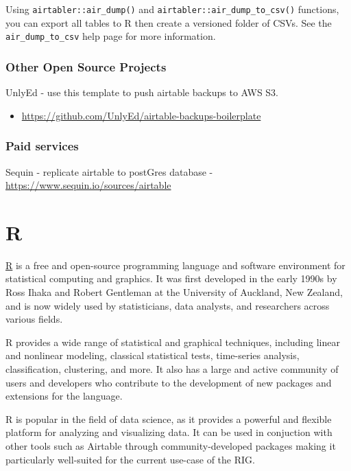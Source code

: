 \documentclass[
]{book}
\providecommand{\tightlist}{%
  \setlength{\itemsep}{0pt}\setlength{\parskip}{0pt}}
\begin{document}
Using \texttt{airtabler::air\_dump()} and \texttt{airtabler::air\_dump\_to\_csv()} functions, you can export all tables to R then create a versioned folder of CSVs. See the \texttt{air\_dump\_to\_csv} help page for more information.

\hypertarget{other-open-source-projects}{%
\subsubsection{Other Open Source Projects}\label{other-open-source-projects}}

UnlyEd - use this template to push airtable backups to AWS S3.

\begin{itemize}
\tightlist
\item
  \url{https://github.com/UnlyEd/airtable-backups-boilerplate}
\end{itemize}

\hypertarget{paid-services}{%
\subsubsection{Paid services}\label{paid-services}}

Sequin - replicate airtable to postGres database
- \url{https://www.sequin.io/sources/airtable}

\hypertarget{r}{%
\section{R}\label{r}}

\href{https://cran.r-project.org}{R} is a free and open-source programming language and software environment for statistical computing and graphics. It was first developed in the early 1990s by Ross Ihaka and Robert Gentleman at the University of Auckland, New Zealand, and is now widely used by statisticians, data analysts, and researchers across various fields.

R provides a wide range of statistical and graphical techniques, including linear and nonlinear modeling, classical statistical tests, time-series analysis, classification, clustering, and more. It also has a large and active community of users and developers who contribute to the development of new packages and extensions for the language.

R is popular in the field of data science, as it provides a powerful and flexible platform for analyzing and visualizing data. It can be used in conjuction with other tools such as Airtable through community-developed packages making it particularly well-suited for the current use-case of the RIG.
\end{document}
